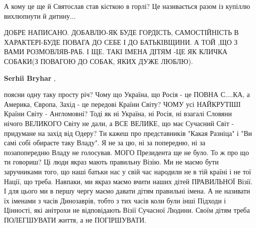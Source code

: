 \begin{itemize}
\begin{itemize}
 
А кому це ще й Святослав став кісткою в горлі? Це називається разом із купіллю вихлюпнути й дитину...
\end{itemize}

 

ДОБРЕ НАПИСАНО. ДОБАВЛЮ-ЯК БУДЕ ГОРДІСТЬ, САМОСТІЙНІСТЬ В ХАРАКТЕРІ-БУДЕ ПОВАГА
ДО СЕБЕ І ДО БАТЬКІВЩИНИ. А ТОЙ ,ЩО З ВАМИ РОЗМОВЛЯВ-РАБ. І ЩЕ. ТАКІ ІМЕНА ДІТЯМ
-ЦЕ ЯК КЛИЧКА СОБАКИ(З ПОВАГОЮ ДО СОБАК, ЯКИХ ДУЖЕ ЛЮБЛЮ).


 
\textbf{Serhii Bryhar} , 

поясни одну таку просту річ? Чому що Україна, що Росія - це ПОВНА С....КА, а
Америка, Європа, Захід - це передові Країни Світу? ЧОМУ усі НАЙКРУТІШІ Країни
Світу - Англомовні? Тоді як ні Україна, ні Росія, ні взагалі Словяни нічого
ВЕЛИКОГО Світу не дали, а ВСЕ ВЕЛИКЕ, що має Сучасний Світ - придумане на захід
від Одеру? Ти кажеш про представників "Какая Разніца" і "Ви самі собі обираєте
таку Владу". Я не за цю, ні за попередню, ні за позапопередню Владу не
голосував. МОГО Президента ще не було. То ж про що ти говориш? Ці люди якраз
мають правильну Візію. Ми не маємо бути заручниками того, що наші батьки нас у
свій час народили не в тій країні і не тої Нації, що треба. Навпаки, ми якраз
маємо вчити наших дітей ПРАВИЛЬНОЇ Візії. І для цього ми в першу чергу маємо
давати дітям правильні імена. А не називати їх іменами з часів Динозаврів,
тобто з тих часів коли були інші Підходи і Цінності, які анітрохи не
відповідають Візії Сучасної Людини. Своїм дітям треба ПОЛЕГШУВАТИ життя, а не
ПОГІРШУВАТИ.

\begin{itemize}
 

\end{itemize}
\end{itemize}
